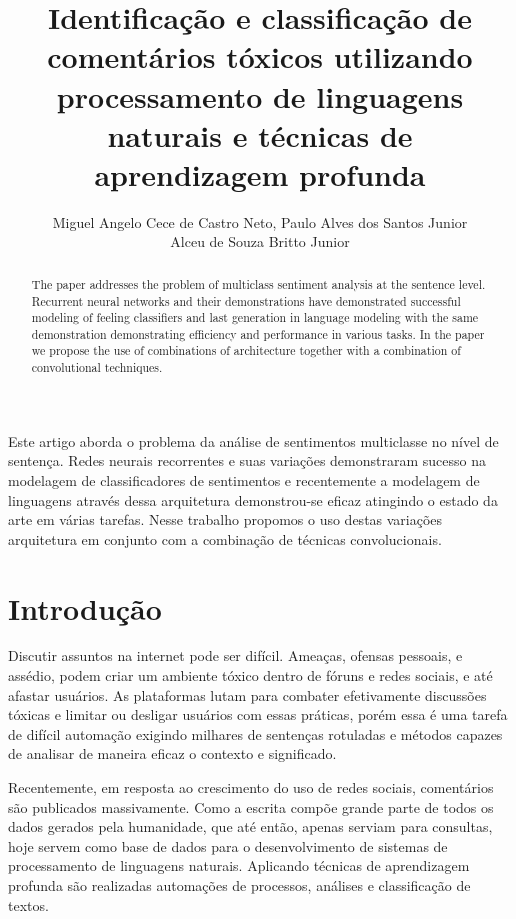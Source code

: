 \documentclass[12pt]{article}
\title{Identificação e classificação de comentários tóxicos utilizando processamento de linguagens naturais e técnicas de aprendizagem profunda}
\author{
    Miguel Angelo Cece de Castro Neto\inst{1},
    Paulo Alves dos Santos Junior\inst{1}\\
    Alceu de Souza Britto Junior\inst{2}
}
\begin{document}
\maketitle

\begin{abstract}
  The paper addresses the problem of multiclass sentiment analysis at the sentence level. Recurrent neural networks and their demonstrations have demonstrated successful modeling of feeling classifiers and last generation in language modeling with the same demonstration demonstrating efficiency and performance in various tasks. In the paper we propose the use of combinations of architecture together with a combination of convolutional techniques.
\end{abstract}

\begin{resumo}
  Este artigo aborda o problema da análise de sentimentos multiclasse no nível de sentença. Redes neurais recorrentes e suas variações demonstraram sucesso na modelagem de classificadores de sentimentos e recentemente a modelagem de linguagens através dessa arquitetura demonstrou-se eficaz atingindo o estado da arte em várias tarefas. Nesse trabalho propomos o uso destas variações arquitetura em conjunto com a combinação de técnicas convolucionais.
\end{resumo}


\section{Introdução} \label{sec:introducao}

Discutir assuntos na internet pode ser difícil. Ameaças, ofensas pessoais, e assédio, podem criar um ambiente tóxico dentro de fóruns e redes sociais, e até afastar usuários. As plataformas lutam para combater efetivamente discussões tóxicas e limitar ou desligar usuários com essas práticas, porém essa é uma tarefa de difícil automação exigindo milhares de sentenças rotuladas e métodos capazes de analisar de maneira eficaz o contexto e significado.

Recentemente, em resposta ao crescimento do uso de redes sociais, comentários são publicados massivamente. Como a escrita compõe grande parte de todos os dados gerados pela humanidade, que até então, apenas serviam para consultas, hoje servem como base de dados para o desenvolvimento de sistemas de processamento de linguagens naturais. Aplicando técnicas de aprendizagem profunda são realizadas automações de processos, análises e classificação de textos.
\end{document}
